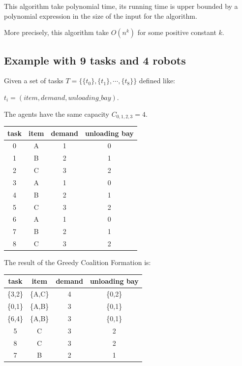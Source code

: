 This algorithm take polynomial time, its running time is upper bounded by a polynomial expression
in the size of the input for the algorithm.

More precisely, this algorithm take $O(n^k)$ for some positive constant $k$. 

\newpage



\newpage
\subsection*{Example with 9 tasks and 4 robots}
Given a set of tasks $T = \{  \{t_0\}, \{t_1\}, \cdots, \{t_8\} \}$ defined like:

${t_i=(item, demand, unloading\_bay)}$.

The agents have the same capacity $C_{0,1,2,3} = 4$.

\begin{center}
  \begin{tabular}{|c|c|c|c|} \hline
  \textbf{task} & \textbf{item} & \textbf{demand} & \textbf{unloading bay} \\ \hline
  0    & A    & 1      & 0             \\
  1    & B    & 2      & 1             \\
  2    & C    & 3      & 2             \\
  3    & A    & 1      & 0             \\
  4    & B    & 2      & 1             \\
  5    & C    & 3      & 2             \\
  6    & A    & 1      & 0             \\
  7    & B    & 2      & 1             \\
  8    & C    & 3      & 2             \\ \hline       
  \end{tabular}
\end{center}


The result of the Greedy Coalition Formation is:
\begin{center}
  \begin{tabular}{|c|c|c|c|} \hline
  \textbf{task} & \textbf{item} & \textbf{demand} & \textbf{unloading bay} \\ \hline
  \{3,2\}    & \{A,C\}    & 4     & \{0,2\}             \\
  \{0,1\}    & \{A,B\}    & 3     & \{0,1\}             \\
  \{6,4\}    & \{A,B\}    & 3     & \{0,1\}             \\
  5    & C    & 3      & 2             \\
  8    & C    & 3      & 2             \\        
  7    & B    & 2      & 1             \\\hline
  \end{tabular}
\end{center}

